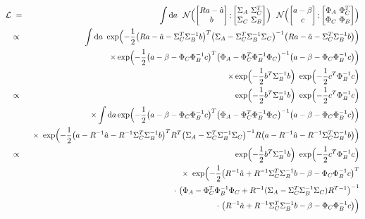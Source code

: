 \documentclass{article}
\renewcommand{\d}{{\mathrm{d}}}
\newcommand{\eqn}[1]{\begin{eqnarray}#1\end{eqnarray}}
\begin{document}
\eqn{
	 \mathcal{L} &\ =\ & \int \d a 
	\ \ \mathcal{N} \Bigl(  \begin{bmatrix}Ra - \hat{a}\\ b \end{bmatrix}; \begin{bmatrix}\Sigma_A\ \Sigma_{C}^T\\\Sigma_C \ \Sigma_B  \end{bmatrix} \Bigr) 
	 \ \ \mathcal{N} \Bigl(  \begin{bmatrix}a - \beta\\ c \end{bmatrix}; \begin{bmatrix}\Phi_A\ \Phi_{C}^T\\\Phi_C \ \Phi_B  \end{bmatrix} \Bigr) \\
	&\propto& \int \d a 
		\ \exp\Bigl(-\frac{1}{2}\bigl( Ra - \hat{a} - \Sigma_C^T\Sigma_B^{-1}b \bigr)^T\bigl( \Sigma_A-\Sigma_C^T\Sigma_B^{-1}\Sigma_C \bigr)^{-1}\bigl( Ra - \hat{a} - \Sigma_C^T\Sigma_B^{-1}b  \bigr)  \Bigr)
		 \\ && \quad\quad \times \exp\Bigl(-\frac{1}{2}\bigl( a-\beta-\Phi_C\Phi_B^{-1}c \bigr)^T\bigl( \Phi_A-\Phi_C^T\Phi_B^{-1}\Phi_C \bigr)^{-1}\bigl( a-\beta-\Phi_C\Phi_B^{-1}c \bigr)  \Bigr)\nonumber
		 \\ && \quad\quad \times  \exp\Bigl(-\frac{1}{2} b^T\Sigma_B^{-1}b \Bigr) \   \exp\Bigl(-\frac{1}{2} c^T\Phi_B^{-1}c \Bigr) \nonumber\\
	& \propto& \ \ \exp\Bigl(-\frac{1}{2} b^T\Sigma_B^{-1}b \Bigr) \   \exp\Bigl(-\frac{1}{2} c^T\Phi_B^{-1}c \Bigr)  \\
	 &&   \times   \int \d a \exp\Bigl(-\frac{1}{2}\bigl( a-\beta-\Phi_C\Phi_B^{-1}c \bigr)^T\bigl( \Phi_A-\Phi_C^T\Phi_B^{-1}\Phi_C \bigr)^{-1}\bigl( a-\beta-\Phi_C\Phi_B^{-1}c \bigr)  \Bigr)\nonumber
		 \\ &&  \times  \ \exp\Bigl(-\frac{1}{2}\bigl( a - R^{-1}\hat{a} - R^{-1}\Sigma_C^T\Sigma_B^{-1}b \bigr)^TR^T\bigl( \Sigma_A-\Sigma_C^T\Sigma_B^{-1}\Sigma_C \bigr)^{-1} R\bigl( a - R^{-1}\hat{a} - R^{-1}\Sigma_C^T\Sigma_B^{-1}b  \bigr)  \Bigr)\nonumber\\
	 & \propto& \ \ \exp\Bigl(-\frac{1}{2} b^T\Sigma_B^{-1}b \Bigr) \   \exp\Bigl(-\frac{1}{2} c^T\Phi_B^{-1}c \Bigr)  \\
	 &&   \times \  \exp\Bigl(-\frac{1}{2}\bigl( R^{-1}\hat{a} + R^{-1}\Sigma_C^T\Sigma_B^{-1}b -\beta-\Phi_C\Phi_B^{-1}c \bigr)^T \nonumber\\
	&& \hspace*{4cm} \cdot \ \bigl( \Phi_A-\Phi_C^T\Phi_B^{-1}\Phi_C  + R^{-1} ( \Sigma_A - \Sigma_C^T\Sigma_B^{-1}\Sigma_C )R^{T-1}\bigr)^{-1}    \nonumber\\
	&& \hspace*{8cm} \cdot \	\bigl( R^{-1}\hat{a} + R^{-1}\Sigma_C^T\Sigma_B^{-1}b -\beta-\Phi_C\Phi_B^{-1}c \bigr)  \Bigr)\nonumber
}
\end{document}

